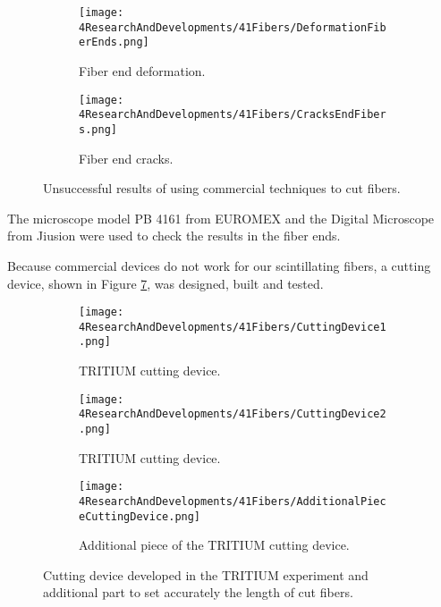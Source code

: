 \begin{figure}
\centering
    \begin{subfigure}[b]{0.5\textwidth}
    \centering
    \texttt{[image: 4ResearchAndDevelopments/41Fibers/DeformationFiberEnds.png]}  
    \caption{Fiber end deformation.\label{subfig:FiberEndDeformation}}
    \end{subfigure}
    \hfill
    \begin{subfigure}[b]{0.45\textwidth}
    \centering
    \texttt{[image: 4ResearchAndDevelopments/41Fibers/CracksEndFibers.png]}  
    \caption{Fiber end cracks.\label{subfig:FiberEndCracks}}
    \end{subfigure}
 \caption{Unsuccessful results of using commercial techniques to cut fibers.}
 \label{fig:BadCutsOfFibers}
\end{figure}

The microscope model PB 4161 from EUROMEX and the Digital Microscope from Jiusion were used to check the results in the fiber ends. 

Because commercial devices do not work for our scintillating fibers, a cutting device, shown in Figure \ref{fig:CuttingTRITIUMDevice}, was designed, built and tested.

\begin{figure}[h]
\centering
    \begin{subfigure}[b]{0.4\textwidth}
    \centering
    \texttt{[image: 4ResearchAndDevelopments/41Fibers/CuttingDevice1.png]}  
    \caption{TRITIUM cutting device.\label{subfig:CuttingDevice1}}
    \end{subfigure}
    \hfill
    \begin{subfigure}[b]{0.55\textwidth}
    \centering
    \texttt{[image: 4ResearchAndDevelopments/41Fibers/CuttingDevice2.png]}  
    \caption{TRITIUM cutting device.\label{subfig:CuttingDevice2}}
    \end{subfigure}
    \hfill
    \begin{subfigure}[b]{0.6\textwidth}
    \centering
    \texttt{[image: 4ResearchAndDevelopments/41Fibers/AdditionalPieceCuttingDevice.png]}  
    \caption{Additional piece of the TRITIUM cutting device.\label{subfig:AdditionalPieceCuttingDevice}}
    \end{subfigure}
 \caption{Cutting device developed in the TRITIUM experiment and additional part to set accurately the length of cut fibers.}
 \label{fig:CuttingTRITIUMDevice}
\end{figure}

